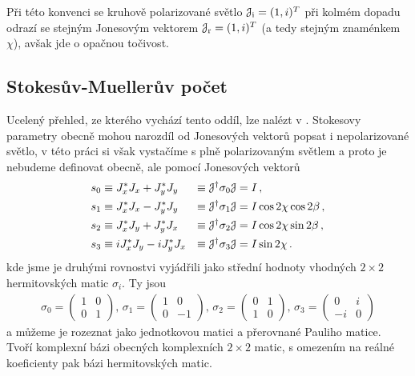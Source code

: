 Při této konvenci se kruhově polarizované světlo $\mathcal{J}_\textrm{i}=(1, i)^T$ při kolmém dopadu odrazí se stejným Jonesovým vektorem $\mathcal{J}_\textrm{r}=(1, i)^T$ (a tedy stejným znaménkem $\chi$), avšak jde o opačnou točivost.


\subsection{Stokesův-Muellerův počet}
\label{chap:Stokes-Mueller}

Ucelený přehled, ze kterého vychází tento oddíl, lze nalézt v \cite{gilReviewMuellerMatrix2014,ossikovskiPoincareSphereMapping2013}.
Stokesovy parametry obecně mohou narozdíl od Jonesových vektorů popsat i nepolarizované světlo,
v této práci si však vystačíme s plně polarizovaným světlem a proto je nebudeme definovat obecně, ale pomocí Jonesových vektorů
\begin{alignat}{3}
    s_0 &\equiv J_x^* J_x+J_y^* J_y &\equiv \mathcal{J}^\dagger \sigma_0 \mathcal{J} &= I \,,\\
    s_1 &\equiv J_x^* J_x-J_y^* J_y &\equiv \mathcal{J}^\dagger \sigma_1 \mathcal{J} &= I \cos 2\chi \cos 2\beta \,,  \\
    s_2 &\equiv J_x^* J_y+J_y^* J_x &\equiv \mathcal{J}^\dagger \sigma_2 \mathcal{J} &= I \cos 2\chi \sin 2\beta \,, \\
    s_3 &\equiv i J_x^* J_y-i J_y^* J_x  &\equiv \mathcal{J}^\dagger \sigma_3 \mathcal{J} &= I \sin 2\chi \,.
\end{alignat}
kde jsme je druhými rovnostvi vyjádřili jako střední hodnoty vhodných $2\times 2$ hermitovských matic $\sigma_{i}$. Ty jsou
\begin{align}
    \sigma_0=\begin{pmatrix} 1 & 0 \\ 0 & 1 \end{pmatrix} ,\,
    \sigma_1=\begin{pmatrix} 1 & 0 \\ 0 & -1 \end{pmatrix} ,\,
    \sigma_2=\begin{pmatrix} 0 & 1 \\ 1 & 0 \end{pmatrix} ,\,
    \sigma_3=\begin{pmatrix} 0 & i \\ -i & 0 \end{pmatrix}
\end{align}
a můžeme je rozeznat jako jednotkovou matici a přerovnané Pauliho matice.
Tvoří komplexní bázi obecných komplexních $2\times 2$ matic, s omezením na reálné koeficienty pak bázi hermitovských matic. 

